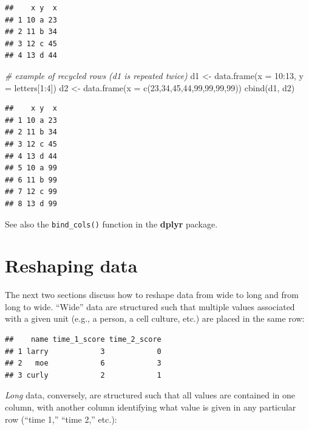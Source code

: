 \documentclass[
]{book}
\newenvironment{Shaded}{\begin{snugshade}}{\end{snugshade}}
\newcommand{\AttributeTok}[1]{\textcolor[rgb]{0.77,0.63,0.00}{#1}}
\newcommand{\CommentTok}[1]{\textcolor[rgb]{0.56,0.35,0.01}{\textit{#1}}}
\newcommand{\DecValTok}[1]{\textcolor[rgb]{0.00,0.00,0.81}{#1}}
\newcommand{\FunctionTok}[1]{\textcolor[rgb]{0.00,0.00,0.00}{#1}}
\newcommand{\NormalTok}[1]{#1}
\newcommand{\OtherTok}[1]{\textcolor[rgb]{0.56,0.35,0.01}{#1}}
\newcommand{\SpecialCharTok}[1]{\textcolor[rgb]{0.00,0.00,0.00}{#1}}
\begin{document}
\begin{verbatim}
##    x y  x
## 1 10 a 23
## 2 11 b 34
## 3 12 c 45
## 4 13 d 44
\end{verbatim}

\begin{Shaded}
\begin{Highlighting}[]
\CommentTok{\# example of recycled rows (d1 is repeated twice)}
\NormalTok{d1 }\OtherTok{\textless{}{-}} \FunctionTok{data.frame}\NormalTok{(}\AttributeTok{x =} \DecValTok{10}\SpecialCharTok{:}\DecValTok{13}\NormalTok{, }\AttributeTok{y =}\NormalTok{ letters[}\DecValTok{1}\SpecialCharTok{:}\DecValTok{4}\NormalTok{])}
\NormalTok{d2 }\OtherTok{\textless{}{-}} \FunctionTok{data.frame}\NormalTok{(}\AttributeTok{x =} \FunctionTok{c}\NormalTok{(}\DecValTok{23}\NormalTok{,}\DecValTok{34}\NormalTok{,}\DecValTok{45}\NormalTok{,}\DecValTok{44}\NormalTok{,}\DecValTok{99}\NormalTok{,}\DecValTok{99}\NormalTok{,}\DecValTok{99}\NormalTok{,}\DecValTok{99}\NormalTok{))}
\FunctionTok{cbind}\NormalTok{(d1, d2)}
\end{Highlighting}
\end{Shaded}

\begin{verbatim}
##    x y  x
## 1 10 a 23
## 2 11 b 34
## 3 12 c 45
## 4 13 d 44
## 5 10 a 99
## 6 11 b 99
## 7 12 c 99
## 8 13 d 99
\end{verbatim}

See also the \texttt{bind\_cols()} function in the \textbf{dplyr} package.

\hypertarget{reshaping-data}{%
\section{Reshaping data}\label{reshaping-data}}

The next two sections discuss how to reshape data from wide to long and from long to wide. ``Wide'' data are structured such that multiple values associated with a given unit (e.g., a person, a cell culture, etc.) are placed in the same row:

\begin{verbatim}
##    name time_1_score time_2_score
## 1 larry            3            0
## 2   moe            6            3
## 3 curly            2            1
\end{verbatim}

\emph{Long} data, conversely, are structured such that all values are contained in one column, with another column identifying what value is given in any particular row (``time 1,'' ``time 2,'' etc.):
\end{document}
